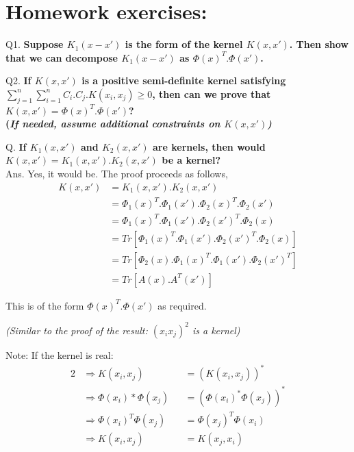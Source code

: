 \documentclass[11pt, twosides]{article}
\begin{document}
\section{Homework exercises:}

\begin{flushleft}
Q1. \textbf{Suppose $K_1(x-x')$ is the form of the kernel $K(x,x')$. Then show that we can decompose $K_1(x-x')$ as $\Phi(x)^T.\Phi(x')$. }\\
\end{flushleft}

\begin{flushleft}
Q2. \textbf{If $K(x,x')$ is a positive semi-definite kernel satisfying $\sum_{j=1}^{n}\sum_{i=1}^{n} C_i.C_j.K(x_i,x_j) \geq 0$, then can we prove that $K(x,x') = \Phi(x)^T.\Phi(x')$?\\ (\textit{If needed, assume additional constraints on $K(x,x')$)}} \\
\end{flushleft}


\begin{flushleft}
Q. \textbf{If $K_1(x,x')$ and $K_2(x,x')$ are kernels, then would $K(x,x') = K_1(x,x').K_2(x,x')$ be a kernel?} \\
Ans. \color{blue}
Yes, it would be. The proof proceeds as follows, 
\begin{equation}
\begin{split}
    K(x, x') & = K_1(x,x').K_2(x,x') \\
             & = \Phi_1(x)^T.\Phi_1(x').\Phi_2(x)^T.\Phi_2(x') \\ 
             & = \Phi_1(x)^T.\Phi_1(x').\Phi_2(x')^T.\Phi_2(x) \\ 
             & = Tr[\Phi_1(x)^T.\Phi_1(x').\Phi_2(x')^T.\Phi_2(x)] \\ 
             & = Tr[\Phi_2(x).\Phi_1(x)^T.\Phi_1(x').\Phi_2(x')^T] \\ 
             & = Tr[A(x).A^T(x')] 
    \end{split}            
\end{equation}


This is of the form $\Phi(x)^T.\Phi(x')$ as required.

\textit{(Similar to the proof of the result: $(x_ix_j)^2$ is a kernel)}
\end{flushleft}

Note:
If the kernel is real:
\begin{alignat}{2}
     & \Rightarrow K(x_i, x_j) && = (K(x_i, x_j))^*\\
     & \Rightarrow \Phi(x_i)*\Phi(x_j) && = (\Phi(x_i)^*\Phi(x_j))^*\\
     & \Rightarrow \Phi(x_i)^T \Phi(x_j) && = \Phi(x_j)^T\Phi(x_i)\\
     & \Rightarrow K(x_i, x_j) &&= K(x_j, x_i)
\end{alignat}
\end{document}
